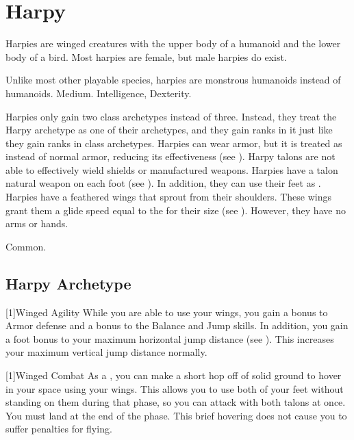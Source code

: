 \section{Harpy}
  Harpies are winged creatures with the upper body of a humanoid and the lower body of a bird.
  Most harpies are female, but male harpies do exist.

   Unlike most other playable species, harpies are monstrous humanoids instead of humanoids.
   Medium.
    Intelligence,  Dexterity.
  \begin{itemize}
     Harpies only gain two class archetypes instead of three.
      Instead, they treat the Harpy archetype as one of their archetypes, and they gain ranks in it just like they gain ranks in class archetypes.
     Harpies can wear armor, but it is treated as  instead of normal armor, reducing its effectiveness (see ).
      Harpy talons are not able to effectively wield shields or manufactured weapons.
     Harpies have a talon natural weapon on each foot (see ).
      In addition, they can use their feet as .
     Harpies have a feathered wings that sprout from their shoulders.
      These wings grant them a glide speed equal to the  for their size (see ).
      However, they have no arms or hands.
  \end{itemize}
   Common.

  \subsection{Harpy Archetype}

    [1]{Winged Agility} While you are able to use your wings, you gain a  bonus to Armor defense and a  bonus to the Balance and Jump skills.
      In addition, you gain a  foot bonus to your maximum horizontal jump distance (see ).
      This increases your maximum vertical jump distance normally.

    [1]{Winged Combat} As a , you can make a short hop off of solid ground to hover in your space using your wings.
      This allows you to use both of your feet without standing on them during that phase, so you can attack with both talons at once.
      You must land at the end of the phase.
      This brief hovering does not cause you to suffer penalties for flying.

